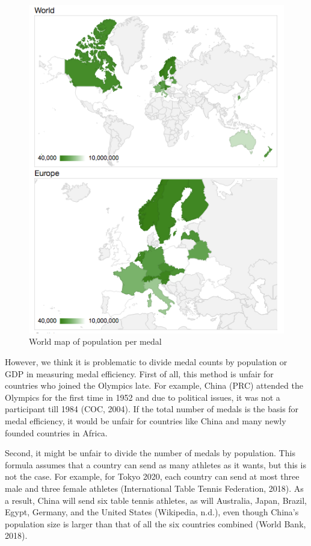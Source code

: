 \documentclass[12pt]{article}
\begin{document}
\begin{figure}[!b]
\begin{minipage}[b]{0.45\textwidth}
    \includegraphics[scale=0.3]{pics/3-6.png}
    \caption{\footnotesize World map of population per medal}
    \label{fig:2}
  \end{minipage}
\end{figure}
\FloatBarrier %

However, we think it is problematic to divide medal counts by population or GDP in measuring medal efficiency. First of all, this method is unfair for countries who joined the Olympics late. For example, China (PRC) attended the Olympics for the first time in 1952 and due to political issues, it was not a participant till 1984 (COC, 2004). If the total number of medals is the basis for medal efficiency, it would be unfair for countries like China and many newly founded countries in Africa. 

Second, it might be unfair to divide the number of medals by population. This formula assumes that a country can send as many athletes as it wants, but this is not the case. For example, for Tokyo 2020, each country can send at most three male and three female athletes (International Table Tennis Federation, 2018). As a result, China will send six table tennis athletes, as will Australia, Japan, Brazil, Egypt, Germany, and the United States (Wikipedia, n.d.), even though China’s population size is larger than that of all the six countries combined (World Bank, 2018).
\end{document}
